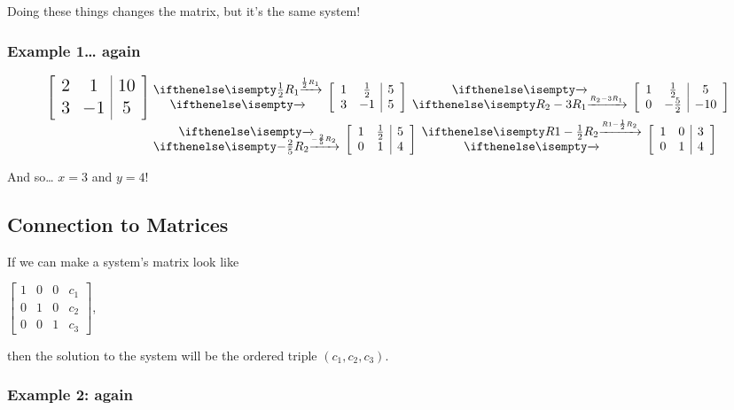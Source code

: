 \documentclass[
  letterpaper,
  DIV=11,
  numbers=noendperiod]{scrartcl}
\begin{document}
Doing these things changes the matrix, but it's the same system!

\subsubsection{Example 1\ldots{} again}\label{example-1-again}


\begin{align*}
\Large
\left[\begin{array}{cc|c}2 & 1 & 10 \\ 3 & -1 & 5 \end{array} \right]&\rowops{\frac{1}{2}R_1,}\left[\begin{array}{cc|c}1 & \frac{1}{2} & 5 \\ 3 & -1 & 5 \end{array} \right] \rowops{,R_2-3R_1}\left[\begin{array}{cc|c}1 & \frac{1}{2} & 5 \\ 0 & -\frac{5}{2} & -10 \end{array}\right] \\
&\rowops{,-\frac{2}{5}R_2} \left[\begin{array}{cc|c}1 & \frac{1}{2} & 5 \\ 0 & 1 & 4 \end{array}\right]\rowops{R1-\frac{1}{2}R_2,}\left[\begin{array}{cc|c}1 & 0 & 3 \\ 0 & 1 & 4 \end{array}\right]
\end{align*}

And so\ldots{} \(x=3\) and \(y=4\)!

\subsection{Connection to Matrices}\label{connection-to-matrices}

If we can make a system's matrix look like

\(\left[\begin{array}{ccc|c}1 & 0 & 0 & c_1 \\ 0 & 1 & 0 & c_2 \\ 0 & 0 & 1 & c_3 \end{array}\right]\),

then the solution to the system will be the ordered triple
\((c_1, c_2, c_3)\).

\subsubsection{Example 2: again}\label{example-2-again}
\end{document}
